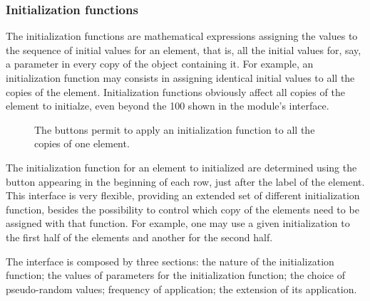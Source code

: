 \documentclass [11pt,a4paper] {book}
\begin{document}
\subsubsection{Initialization functions}\label{sssec:setall}

The initialization functions are mathematical expressions assigning the values to the sequence of initial values for an element, that is, all the initial values for, say, a parameter in every copy of the object containing it. For example, an initialization function may consists in assigning identical initial values to all the copies of the element. Initialization functions obviously affect all copies of the element to initialze, even beyond the 100 shown in the module's interface.

\begin{figure}[ht]
  \centering
  \caption{\small The  buttons permit to apply an initialization function to all the copies of one element.}
  \label{fig:setall}
\end{figure}


The initialization function for an element to initialized are determined using the button  appearing in the beginning of each row, just after the label of the element. This interface is very flexible, providing an extended set of different initialization function, besides the possibility to control which copy of the elements need to be assigned with that function. For example, one may use a given initialization to the first half of the elements and another for the second half. 

The  interface is composed by three sections: the nature of the initialization function; the values of parameters for the initialization function; the choice of pseudo-random values; frequency of application; the extension of its application.
\end{document}
